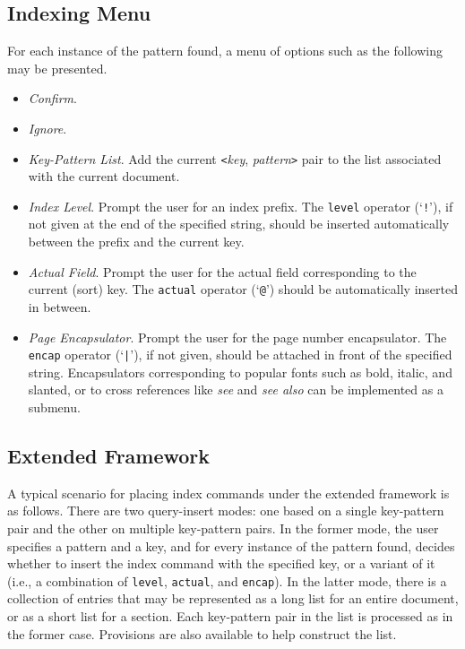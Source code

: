 \subsection{Indexing Menu}
For each instance of the pattern found, a menu of options such as the
following may be presented.
\begin{itemize}
  \item {\it Confirm\/}.
  \item {\it Ignore\/}.
  \item {\it Key-Pattern List\/}.  Add the current
	\verb|<|{\it key\/}, {\it pattern\/}\verb|>| pair to the list
	associated with the current document.
  \item {\it Index Level\/}.  Prompt the user for an index prefix.
	The \verb|level| operator (`\verb|!|'), if not given at the end
	of the specified string, should be inserted automatically between
	the prefix and the current key.
  \item {\it Actual Field\/}.  Prompt the user for the actual field
	corresponding to the current (sort) key.  The \verb|actual|
	operator (`\verb|@|') should be automatically inserted in between.
  \item {\it Page Encapsulator\/}.  Prompt the user for the page
	number encapsulator.  The \verb|encap| operator (`\verb#|#'),
	if not given, should be attached in front of the specified string.
	Encapsulators corresponding to popular fonts such as bold, italic,
	and slanted, or to cross references like {\it see\/} and
	{\it see also\/} can be implemented as a submenu.
\end{itemize}

\subsection{Extended Framework}
A typical scenario for placing index commands under the extended framework
is as follows.  There are two query-insert modes: 
one based on a single key-pattern pair and the other
on multiple key-pattern pairs.
In the former mode, the user specifies a pattern and a key, and for
every instance of the pattern found, decides whether to insert the
index command with the specified key, or a variant of it (i.e., a combination
of \verb|level|, \verb|actual|, and \verb|encap|).
In the latter mode, there is a collection of entries that may be represented
as a long list for an entire document, or as a short list for a section.
Each key-pattern pair in the list is processed as in the former case.
Provisions are also available to help construct the list.

